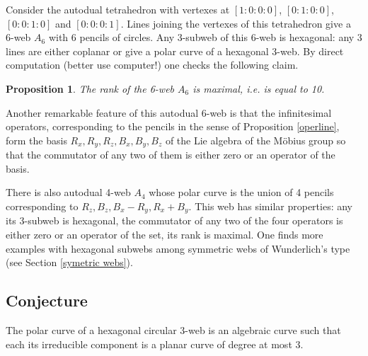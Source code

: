 \documentclass[11pt,a4paper]{article}
\newtheorem{proposition}[theorem]{Proposition}
\begin{document}
Consider the autodual  tetrahedron with vertexes at $[1:0:0:0]$, $[0:1:0:0]$, $[0:0:1:0]$ and $[0:0:0:1]$. Lines joining the vertexes of this tetrahedron give a 6-web $A_6$ with 6 pencils of circles. Any 3-subweb of this 6-web is hexagonal: any 3 lines are either coplanar or give a polar curve of a hexagonal 3-web. By direct computation (better use computer!) one checks the following claim. 
\begin{proposition}
The rank of the 6-web $A_6$ is maximal, i.e. is equal to 10.
\end{proposition} 
Another remarkable feature of this autodual 6-web is that the infinitesimal operators, corresponding to the pencils in the sense of Proposition \ref{operline}, form the basis $R_x,R_y,R_z,B_x,B_y,B_z$ of the Lie algebra of the M\"obius group so that the commutator of any two of them is either zero or an operator of the basis.  

There is also autodual 4-web $A_4$ whose polar curve is the union of 4 pencils corresponding to $R_z,B_z,B_x-R_y,R_x+B_y$. This web has similar properties: any its 3-subweb is hexagonal, the commutator of any two of the four operators is either zero or an operator of the set, its rank is maximal.                                                                                                                                                                                                                                                                                                                                                                                                                                                                                                                                                                                                                                                                                                                                                                                                                                                                                                                                         
One finds more examples with hexagonal subwebs  among symmetric webs of Wunderlich's type (see Section \ref{symetric webs}).  

\subsection{Conjecture}
The polar curve of a hexagonal circular 3-web is an algebraic curve such that
each its irreducible component is a planar curve of degree at most 3. 
\end{document}
